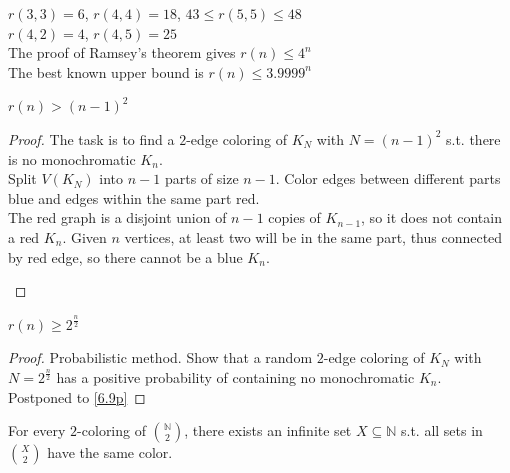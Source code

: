 \begin{remark}\label{6.7}
    $r(3,3)=6$, $r(4,4)=18$, $43\leq r(5,5)\leq 48$\\
    $r(4,2)=4$, $r(4,5)=25$\\
    The proof of Ramsey's theorem gives $r(n)\leq 4^n$\\
    The best known upper bound is $r(n)\leq 3.9999^n$
\end{remark}
\begin{proposition}\label{6.8}
    $r(n)>(n-1)^2$
\end{proposition}
\begin{proof}
    The task is to find a $2$-edge coloring of $K_N$ with $N=(n-1)^2$ s.t. there is no monochromatic $K_n$.\\
    Split $V(K_N)$ into $n-1$ parts of size $n-1$. Color edges between different parts blue and edges within the same part red. \\
    The red graph is a disjoint union of $n-1$ copies of $K_{n-1}$, so it does not contain a red $K_n$. Given $n$ vertices, at least two will be in the same part, thus connected by red edge, so there cannot be a blue $K_n$.
\begin{center}
\end{center}
\end{proof}
\begin{theorem}[Erd\H{o}s]\label{6.9}
    $r(n)\geq 2^{\frac{n}{2}}$
\end{theorem}
\begin{proof}
    Probabilistic method. Show that a random $2$-edge coloring of $K_N$ with $N=2^{\frac{n}{2}}$ has a positive probability of containing no monochromatic $K_n$.\\
    Postponed to \ref{6.9p}
\end{proof}
\begin{theorem}\label{6.10}
    For every $2$-coloring of $\binom{\mathbb{N}}{2}$, there exists an infinite set $X\subseteq\mathbb{N}$ s.t. all sets in $\binom{X}{2}$ have the same color.
\end{theorem}
